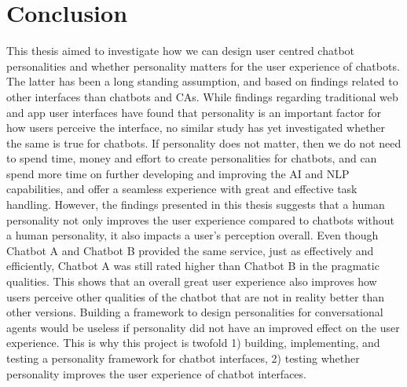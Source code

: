 \chapter{Conclusion}
\label{chap:conclusion}

This thesis aimed to investigate how we can design user centred chatbot personalities and whether personality matters for the user experience of chatbots. The latter has been a long standing assumption, and based on findings related to other interfaces than chatbots and CAs. While findings regarding traditional web and app user interfaces have found that personality is an important factor for how users perceive the interface, no similar study has yet investigated whether the same is true for chatbots. If personality does not matter, then we do not need to spend time, money and effort to create personalities for chatbots, and can spend more time on further developing and improving the AI and NLP capabilities, and offer a seamless experience with great and effective task handling. However, the findings presented in this thesis suggests that a human personality not only improves the user experience compared to chatbots without a human personality, it also impacts a user's perception overall. Even though Chatbot A and Chatbot B provided the same service, just as effectively and efficiently, Chatbot A was still rated higher than Chatbot B in the pragmatic qualities. This shows that an overall great user experience also improves how users perceive other qualities of the chatbot that are not in reality better than other versions. Building a framework to design personalities for conversational agents would be useless if personality did not have an improved effect on the user experience. This is why this project is twofold 1) building, implementing, and testing a personality framework for chatbot interfaces, 2) testing whether personality improves the user experience of chatbot interfaces.

